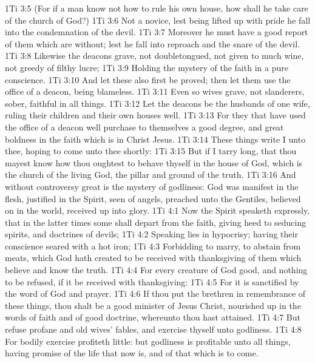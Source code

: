 \vs 1Ti 3:5 (For if a man know not how to rule his own house, how shall he take care of the church of God?)
\vs 1Ti 3:6 Not a novice, lest being lifted up with pride he fall into the condemnation of the devil.
\vs 1Ti 3:7 Moreover he must have a good report of them which are without; lest he fall into reproach and the snare of the devil.
\vs 1Ti 3:8 Likewise  the deacons  grave, not doubletongued, not given to much wine, not greedy of filthy lucre;
\vs 1Ti 3:9 Holding the mystery of the faith in a pure conscience.
\vs 1Ti 3:10 And let these also first be proved; then let them use the office of a deacon, being  blameless.
\vs 1Ti 3:11 Even so  wives  grave, not slanderers, sober, faithful in all things.
\vs 1Ti 3:12 Let the deacons be the husbands of one wife, ruling their children and their own houses well.
\vs 1Ti 3:13 For they that have used the office of a deacon well purchase to themselves a good degree, and great boldness in the faith which is in Christ Jesus.
\vs 1Ti 3:14 These things write I unto thee, hoping to come unto thee shortly:
\vs 1Ti 3:15 But if I tarry long, that thou mayest know how thou oughtest to behave thyself in the house of God, which is the church of the living God, the pillar and ground of the truth.
\vs 1Ti 3:16 And without controversy great is the mystery of godliness: God was manifest in the flesh, justified in the Spirit, seen of angels, preached unto the Gentiles, believed on in the world, received up into glory.
\vs 1Ti 4:1 Now the Spirit speaketh expressly, that in the latter times some shall depart from the faith, giving heed to seducing spirits, and doctrines of devils;
\vs 1Ti 4:2 Speaking lies in hypocrisy; having their conscience seared with a hot iron;
\vs 1Ti 4:3 Forbidding to marry,  to abstain from meats, which God hath created to be received with thanksgiving of them which believe and know the truth.
\vs 1Ti 4:4 For every creature of God  good, and nothing to be refused, if it be received with thanksgiving:
\vs 1Ti 4:5 For it is sanctified by the word of God and prayer.
\vs 1Ti 4:6 If thou put the brethren in remembrance of these things, thou shalt be a good minister of Jesus Christ, nourished up in the words of faith and of good doctrine, whereunto thou hast attained.
\vs 1Ti 4:7 But refuse profane and old wives' fables, and exercise thyself  unto godliness.
\vs 1Ti 4:8 For bodily exercise profiteth little: but godliness is profitable unto all things, having promise of the life that now is, and of that which is to come.
